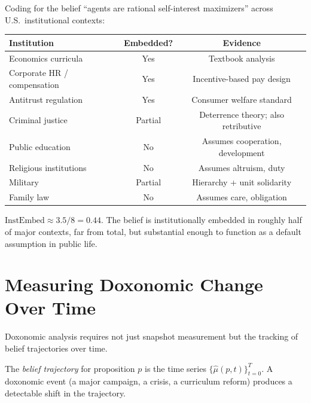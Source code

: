 \begin{example}
\label{ex:embeddedness}
Coding for the belief ``agents are rational self-interest maximizers'' across U.S.\ institutional contexts:
\begin{center}
\begin{tabular}{lcc}
\toprule
\textbf{Institution} & \textbf{Embedded?} & \textbf{Evidence} \\
\midrule
Economics curricula & Yes & Textbook analysis \\
Corporate HR / compensation & Yes & Incentive-based pay design \\
Antitrust regulation & Yes & Consumer welfare standard \\
Criminal justice & Partial & Deterrence theory; also retributive \\
Public education & No & Assumes cooperation, development \\
Religious institutions & No & Assumes altruism, duty \\
Military & Partial & Hierarchy + unit solidarity \\
Family law & No & Assumes care, obligation \\
\bottomrule
\end{tabular}
\end{center}
$\mathrm{InstEmbed} \approx 3.5/8 = 0.44$.
The belief is institutionally embedded in roughly half of major contexts, far from total, but substantial enough to function as a default assumption in public life.
\end{example}


\section{Measuring Doxonomic Change Over Time}
\label{sec:ch13-temporal}

Doxonomic analysis requires not just snapshot measurement but the tracking of belief trajectories over time.

\begin{definition}
\label{def:trajectory}
The \emph{belief trajectory} for proposition $p$ is the time series $\{\hat{\mu}(p, t)\}_{t=0}^{T}$.
A doxonomic event (a major campaign, a crisis, a curriculum reform) produces a detectable shift in the trajectory.
\end{definition}

